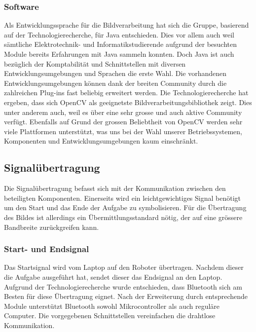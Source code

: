 \subsubsection{Software}
Als Entwicklungssprache für die Bildverarbeitung hat sich die Gruppe, basierend auf der Technologierecherche, für Java entschieden. Dies vor allem auch weil sämtliche Elektrotechnik- und Informatikstudierende aufgrund der besuchten Module bereits Erfahrungen mit Java sammeln konnten. Doch Java ist auch bezüglich der Komptabilität und Schnittstellen mit diversen Entwicklungsumgebungen und Sprachen die erste Wahl. Die vorhandenen Entwicklungsumgebungen können dank der breiten Community durch die zahlreichen Plug-ins fast beliebig erweitert werden.
Die Technologierecherche hat ergeben, dass sich OpenCV als geeignetste Bildverarbeitungsbibliothek zeigt. Dies unter anderem auch, weil es über eine sehr grosse und auch aktive Community verfügt. Ebenfalls auf Grund der grossen Beliebtheit von OpenCV werden sehr viele Plattformen unterstützt, was uns bei der Wahl unserer Betriebssystemen, Komponenten und Entwicklungsumgebungen kaum einschränkt.

\subsection{Signalübertragung}
Die Signalübertragung befasst sich mit der Kommunikation zwischen den beteiligten Komponenten. Einerseits wird ein leichtgewichtiges Signal benötigt um den Start und das Ende der Aufgabe zu symbolisieren. Für die Übertragung des Bildes ist allerdings ein Übermittlungsstandard nötig, der auf eine grössere Bandbreite zurückgreifen kann.
\subsubsection{Start- und Endsignal}
Das Startsignal wird vom Laptop auf den Roboter übertragen. Nachdem dieser die Aufgabe ausgeführt hat, sendet dieser das Endsignal an den Laptop. Aufgrund der Technologierecherche wurde entschieden, dass Bluetooth sich am Besten für diese Übertragung eignet. Nach der Erweiterung durch entsprechende Module unterstützt Bluetooth sowohl Mikrocontroller als auch reguläre Computer. Die vorgegebenen Schnittstellen vereinfachen die drahtlose Kommunikation.
